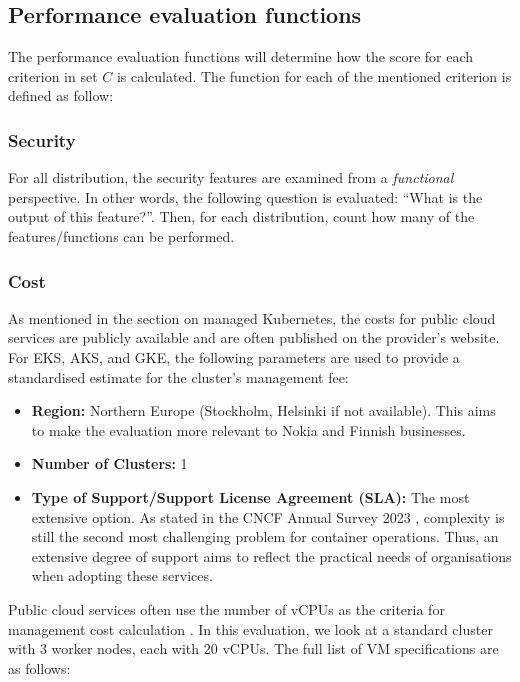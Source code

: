 \subsection{Performance evaluation
functions}\label{performance-evaluation-functions}

The performance evaluation functions will determine how the score for
each criterion in set \(C\) is calculated. The function for each
of the mentioned criterion is defined as follow:

\subsubsection{Security}\label{security}

For all distribution, the security features are examined from a
\emph{functional} perspective. In other words, the following question is
evaluated: ``What is the output of this feature?''. Then, for each
distribution, count how many of the features/functions can be performed.

\subsubsection{Cost}\label{cost}

As mentioned in the section on managed Kubernetes, the costs for public
cloud services are publicly available and are often published on the
provider's website. For EKS, AKS, and GKE, the following parameters are
used to provide a standardised estimate for the cluster's management
fee:

\begin{itemize}
\tightlist
\item
  \textbf{Region:} Northern Europe (Stockholm, Helsinki if not available). This aims to make the
  evaluation more relevant to Nokia and Finnish businesses.
\item
  \textbf{Number of Clusters:} 1
\item
  \textbf{Type of Support/Support License Agreement (SLA):} The most
  extensive option. As stated in the CNCF Annual Survey 2023
  \cite{CNCFAnnualSurvey2024}, complexity is still the second most
  challenging problem for container operations. Thus, an extensive
  degree of support aims to reflect the practical needs of organisations
  when adopting these services.
\end{itemize}

Public cloud services often use the number of vCPUs as the criteria for
management cost calculation
\cite{RedHatOpenShiftc,PricingGoogleKubernetes}. In this evaluation, we
look at a standard cluster with 3 worker nodes, each with 20 vCPUs. The
full list of VM specifications are as follows:


